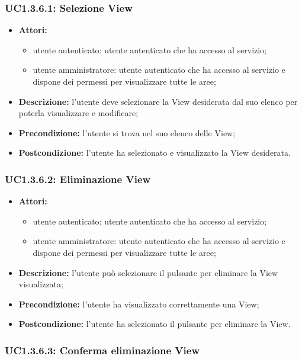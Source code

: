 \subsubsection{UC1.3.6.1: Selezione View}

\begin{itemize}
 	\item \textbf{Attori:}
    \begin{itemize}
    	\item utente autenticato: utente autenticato che ha accesso al servizio;
    	\item utente amministratore: utente autenticato che ha accesso al servizio e dispone dei permessi per visualizzare tutte le aree;
	\end{itemize}
    \item \textbf{Descrizione:} l'utente deve selezionare la View desiderata dal suo elenco per poterla visualizzare e modificare;
    \item \textbf{Precondizione:} l'utente si trova nel suo elenco delle View;
    \item \textbf{Postcondizione:} l'utente ha selezionato e visualizzato la View desiderata.
\end{itemize}

\subsubsection{UC1.3.6.2: Eliminazione View}

\begin{itemize}
   	\item \textbf{Attori:}
    \begin{itemize}
    	\item utente autenticato: utente autenticato che ha accesso al servizio;
    	\item utente amministratore: utente autenticato che ha accesso al servizio e dispone dei permessi per visualizzare tutte le aree;
	\end{itemize}
    \item \textbf{Descrizione:} l'utente può selezionare il pulsante per eliminare la View visualizzata;
    \item \textbf{Precondizione:} l'utente ha visualizzato correttamente una View;
    \item \textbf{Postcondizione:} l'utente ha selezionato il pulsante per eliminare la View.
\end{itemize}

\subsubsection{UC1.3.6.3: Conferma eliminazione View}


